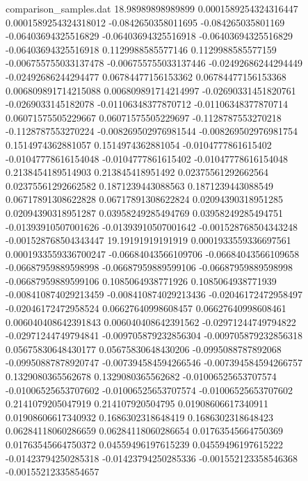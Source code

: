 \begin{filecontents}{comparison_samples.dat}
18.98989898989899   0.0001589254324316447   0.0001589254324318012   -0.0842650358011695    -0.084265035801169     -0.06403694325516829   -0.06403694325516918   -0.06403694325516829   -0.06403694325516918   0.1129988585577146     0.1129988585577159     -0.006755755033137478   -0.006755755033137446   -0.02492686244294449   -0.02492686244294477   0.06784477156153362     0.06784477156153368     0.006809891714215088    0.006809891714214997    -0.02690331451820761    -0.0269033145182078     -0.01106348377870712    -0.01106348377870714    0.06071575505229667     0.06071575505229697     -0.1128787553270218     -0.1128787553270224     -0.008269502976981544  -0.008269502976981754  0.1514974362881057     0.1514974362881054     -0.0104777861615402     -0.01047778616154048    -0.0104777861615402     -0.01047778616154048    0.2138454189514903     0.213845418951492      0.02375561292662564     0.02375561292662582     0.1871239443088563     0.1871239443088549     0.06717891308622828     0.06717891308622824     0.02094390318951285     0.02094390318951287     0.03958249285494769    0.03958249285494751    -0.01393910507001626   -0.01393910507001642   -0.001528768504343248   -0.001528768504343447 
19.19191919191919   0.0001933559336697561   0.0001933559336700247   -0.06684043566109706   -0.06684043566109658   -0.06687959889598998   -0.06687959889599106   -0.06687959889598998   -0.06687959889599106   0.1085064938771926     0.1085064938771939     -0.008410874029213459   -0.008410874029213436   -0.02046172472958497   -0.02046172472958524   0.06627640998608457     0.06627640998608461     0.006040408642391843    0.006040408642391562    -0.02971244749794822    -0.02971244749794841    -0.009705879232856304   -0.009705879232856318   0.05675830648430177     0.05675830648430206     -0.0995088787892068     -0.09950887878920747    -0.007394584594266546  -0.007394584594266757  0.1329080365562678     0.1329080365562682     -0.01006525653707574    -0.01006525653707602    -0.01006525653707574    -0.01006525653707602    0.2141079205047919     0.214107920504795      0.01908606617340911     0.01908606617340932     0.1686302318648419     0.1686302318648423     0.06284118060286659     0.06284118060286654     0.01763545664750369     0.01763545664750372     0.04559496197615239    0.04559496197615222    -0.01423794250285318   -0.01423794250285336   -0.001552123358546368   -0.00155212335854657  

\end{filecontents}
